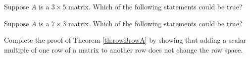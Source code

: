 \documentclass{ximera}
\begin{document}
\begin{problem}\label{prob:truefalse3by5}
Suppose $A$ is a $3\times 5$ matrix.  Which of the following statements could be true?
\begin{selectAll}
 \end{selectAll}
\end{problem}

\begin{problem}\label{prob:truefalse7by3}
Suppose $A$ is a $7\times 3$ matrix.  Which of the following statements could be true?
\begin{selectAll}
 \end{selectAll}
\end{problem}

\begin{problem}\label{prob:proofofrowBrowA}
Complete the proof of Theorem \ref{th:rowBrowA} by showing that adding a scalar multiple of one row of a matrix to another row does not change the row space.
\end{problem}
\end{document}
